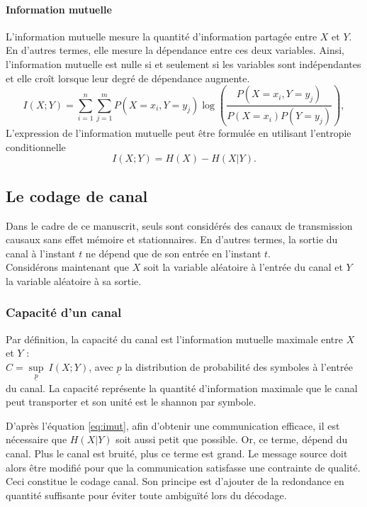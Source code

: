 \paragraph*{Information mutuelle}
L’information mutuelle mesure la quantité d'information partagée entre $X$ et $Y$. En d'autres termes, elle mesure la 
dépendance entre ces deux variables. Ainsi, l'information mutuelle est nulle si et seulement si les variables sont 
indépendantes et elle croît lorsque leur degré de dépendance augmente.
\[I(X;Y) = \sum\limits_{i=1}^n\sum\limits_{j=1}^m P(X=x_i,Y=y_j) \log\left(\frac{P(X=x_i, Y=y_j)}{P(X=x_i)P(Y=y_j)}\right),\]
L'expression de l'information mutuelle peut être formulée en utilisant l'entropie conditionnelle
\begin{equation}
	I(X;Y) = H(X) - H(X|Y).
	\label{eq:imut}
\end{equation}
\subsection{Le codage de canal}
Dans le cadre de ce manuscrit, seuls sont considérés des canaux de transmission causaux sans effet mémoire et stationnaires. 
En d'autres termes, la sortie du canal à l'instant $t$ ne dépend que de son entrée en l'instant $t$.\\
Considérons maintenant que $X$ soit la variable aléatoire à l'entrée du canal et $Y$ la variable aléatoire à sa sortie.
\subsubsection{Capacité d'un canal}
Par définition, la capacité du canal est l'information mutuelle maximale entre $X$ et $Y$ : \\
$C=\sup\limits_{\underline{p}}\ I(X;Y)$, avec $\underline{p}$ la distribution de probabilité des symboles à l'entrée 
du canal. La capacité représente la quantité d'information maximale que le canal peut transporter et son unité est le 
shannon par symbole.

D'après l'équation \ref{eq:imut}, afin d'obtenir une communication efficace, il est nécessaire que $H(X|Y)$ soit aussi
petit que possible. Or, ce terme, dépend du canal. Plus le canal est bruité, plus ce terme est grand. Le message 
source doit alors être modifié pour que la communication satisfasse une contrainte de qualité. Ceci constitue le codage 
canal. Son principe est d'ajouter de la redondance en quantité suffisante pour éviter toute ambiguïté lors du décodage.


